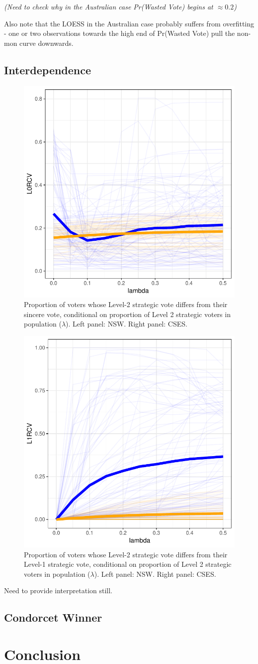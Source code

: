 \documentclass[12pt, letter, margin = 1.5 in]{article}
\begin{document}
\textit{(Need to check why in the Australian case Pr(Wasted Vote) begins at $\approx 0.2$)}

Also note that the LOESS in the Australian case probably suffers from overfitting - one or two observations towards the high end of Pr(Wasted Vote) pull the non-mon curve downwards.

\subsection{Interdependence} \label{interdep}

\begin{figure}[!h]
	\centering
	\includegraphics[width = .6 \textwidth]{"../output/figures/cses_l0"}
	\caption{Proportion of voters whose Level-2 strategic vote differs from their sincere vote, conditional on proportion of Level 2 strategic voters in population ($\lambda$). Left panel: NSW. Right panel: CSES.}
	\label{fig:figure1}
\end{figure}

\begin{figure}[!h]
	\centering
	\includegraphics[width = .6 \textwidth]{"../output/figures/cses_l1"}
	\caption{Proportion of voters whose Level-2 strategic vote differs from their Level-1 strategic vote, conditional on proportion of Level 2 strategic voters in population ($\lambda$). Left panel: NSW. Right panel: CSES.}
	\label{fig:figure1}
\end{figure}

Need to provide interpretation still.

\subsection{Condorcet Winner}

\section{Conclusion}
\end{document}
